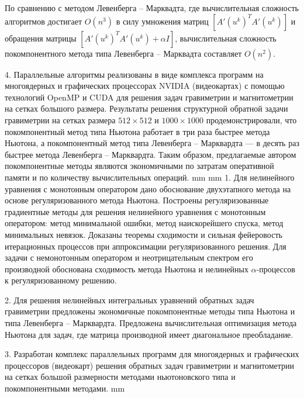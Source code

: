 \documentclass[%
autoref,     %
href,        %
facsimile,   %
colorlinks,  %
]{disser}
\begin{document}
По сравнению с методом Левенберга -- Марквадта, где вычислительная сложность алгоритмов достигает $O(n^3)$ в силу умножения матриц $[A'(u^k)^T A'(u^k)]$ и обращения матрицы $[A'(u^k)^T A'(u^k)+\alpha I]$, вычислительная сложность покомпонентного метода типа Левенберга -- Марквадта составляет $O(n^2)$.

4. Параллельные алгоритмы реализованы в виде комплекса программ на многоядерных и графических процессорах NVIDIA (видеокартах) с помощью технологий OpenMP и CUDA для решения задач гравиметрии и магнитометрии на сетках большого размера. 
Результаты решения структурной обратной задачи гравиметрии на сетках размера $512\times 512$ и $1000\times 1000$ продемонстрировали, что покомпонентный метод типа Ньютона работает в три раза быстрее метода Ньютона, а покомпонентный метод типа Левенберга -- Марквардта --- в десять раз быстрее метода Левенберга -- Марквардта. Таким образом, предлагаемые автором покомпонентные методы являются экономичными по затратам оперативной памяти и по количеству вычислительных операций.
 mm
 mm
1. Для нелинейного уравнения с монотонным оператором дано обоснование двухэтапного метода на основе регуляризованного метода Ньютона. 
Построены %
регуляризованные градиентные методы для решения нелинейного уравнения с монотонным оператором: метод минимальной ошибки, метод наискорейшего спуска, метод минимальных невязок. Доказаны теоремы сходимости и сильная фейеровость итерационных процессов при аппроксимации регуляризованного решения. Для задачи с немонотонным оператором и неотрицательным спектром его производной обоснована сходимость метода  Ньютона и нелинейных $\alpha$-процессов к регуляризованному решению.

2. Для решения нелинейных интегральных уравнений обратных задач гравиметрии предложены экономичные покомпонентные методы 
типа Ньютона и типа Левенберга – Марквардта. Предложена вычислительная оптимизация метода 
Ньютона для задач, где матрица производной имеет диагональное преобладание. 

3. Разработан комплекс параллельных программ для многоядерных и графических процессоров (видеокарт) решения обратных задач гравиметрии и магнитометрии на сетках большой размерности методами ньютоновского типа и покомпонентными методами.
 mm 
\end{document}

